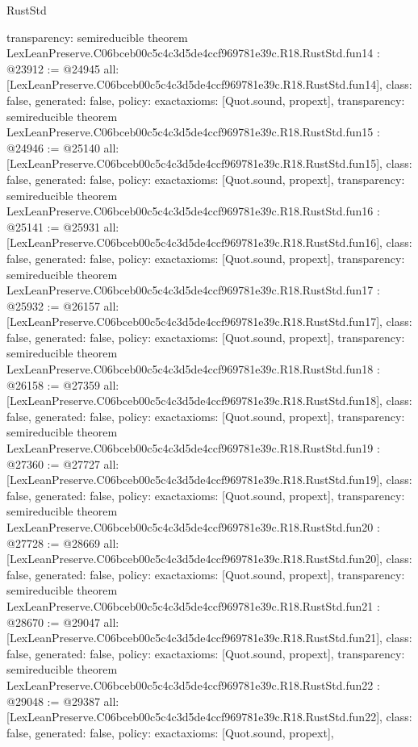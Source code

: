 \begin{lexlean}{RustStd}
\begin{coremodule}
{  transparency: semireducible
}
theorem LexLeanPreserve.C06bceb00c5c4c3d5de4ccf969781e39c.R18.RustStd.fun14 : @23912 := @24945 {
  all: [LexLeanPreserve.C06bceb00c5c4c3d5de4ccf969781e39c.R18.RustStd.fun14],
  class: false,
  generated: false,
  policy: exact{axioms: [Quot.sound, propext]},
  transparency: semireducible
}
theorem LexLeanPreserve.C06bceb00c5c4c3d5de4ccf969781e39c.R18.RustStd.fun15 : @24946 := @25140 {
  all: [LexLeanPreserve.C06bceb00c5c4c3d5de4ccf969781e39c.R18.RustStd.fun15],
  class: false,
  generated: false,
  policy: exact{axioms: [Quot.sound, propext]},
  transparency: semireducible
}
theorem LexLeanPreserve.C06bceb00c5c4c3d5de4ccf969781e39c.R18.RustStd.fun16 : @25141 := @25931 {
  all: [LexLeanPreserve.C06bceb00c5c4c3d5de4ccf969781e39c.R18.RustStd.fun16],
  class: false,
  generated: false,
  policy: exact{axioms: [Quot.sound, propext]},
  transparency: semireducible
}
theorem LexLeanPreserve.C06bceb00c5c4c3d5de4ccf969781e39c.R18.RustStd.fun17 : @25932 := @26157 {
  all: [LexLeanPreserve.C06bceb00c5c4c3d5de4ccf969781e39c.R18.RustStd.fun17],
  class: false,
  generated: false,
  policy: exact{axioms: [Quot.sound, propext]},
  transparency: semireducible
}
theorem LexLeanPreserve.C06bceb00c5c4c3d5de4ccf969781e39c.R18.RustStd.fun18 : @26158 := @27359 {
  all: [LexLeanPreserve.C06bceb00c5c4c3d5de4ccf969781e39c.R18.RustStd.fun18],
  class: false,
  generated: false,
  policy: exact{axioms: [Quot.sound, propext]},
  transparency: semireducible
}
theorem LexLeanPreserve.C06bceb00c5c4c3d5de4ccf969781e39c.R18.RustStd.fun19 : @27360 := @27727 {
  all: [LexLeanPreserve.C06bceb00c5c4c3d5de4ccf969781e39c.R18.RustStd.fun19],
  class: false,
  generated: false,
  policy: exact{axioms: [Quot.sound, propext]},
  transparency: semireducible
}
theorem LexLeanPreserve.C06bceb00c5c4c3d5de4ccf969781e39c.R18.RustStd.fun20 : @27728 := @28669 {
  all: [LexLeanPreserve.C06bceb00c5c4c3d5de4ccf969781e39c.R18.RustStd.fun20],
  class: false,
  generated: false,
  policy: exact{axioms: [Quot.sound, propext]},
  transparency: semireducible
}
theorem LexLeanPreserve.C06bceb00c5c4c3d5de4ccf969781e39c.R18.RustStd.fun21 : @28670 := @29047 {
  all: [LexLeanPreserve.C06bceb00c5c4c3d5de4ccf969781e39c.R18.RustStd.fun21],
  class: false,
  generated: false,
  policy: exact{axioms: [Quot.sound, propext]},
  transparency: semireducible
}
theorem LexLeanPreserve.C06bceb00c5c4c3d5de4ccf969781e39c.R18.RustStd.fun22 : @29048 := @29387 {
  all: [LexLeanPreserve.C06bceb00c5c4c3d5de4ccf969781e39c.R18.RustStd.fun22],
  class: false,
  generated: false,
  policy: exact{axioms: [Quot.sound, propext]},
}
\end{coremodule}
\end{lexlean}
